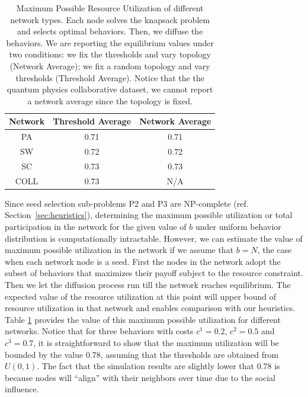 \documentclass[letterpaper]{article}
\theoremstyle{plain} 		\newtheorem{thm}{Theorem}[section]
\theoremstyle{definition} 	\newtheorem{defn}[thm]{Definition}
\theoremstyle{remark}		\newtheorem{rem}{Remark}
\begin{document}
\begin{table}[htb]\footnotesize
\centering
    \caption{Maximum Possible Resource Utilization of different network types. Each node solves the knapsack problem and selects optimal behaviors. Then, we diffuse the behaviors. We are reporting the equilibrium values under two conditions: we fix the thresholds and vary topology (Network Average); we fix a random topology and vary thresholds (Threshold Average). Notice that the the quantum physics collaborative dataset, we cannot report a network average since the topology is fixed. }\label{tab:max-util}
    \begin{tabular}{ccc} \toprule
        Network & Threshold Average & Network Average \\ \midrule
        PA & 0.71 & 0.71		\\
        SW & 0.72 & 0.72 	\\
        SC & 0.73 & 0.73		\\
        COLL & 0.73 & N/A 	\\ \bottomrule
    \end{tabular}

\end{table}
Since seed selection sub-problems P2 and P3 are NP-complete (ref. Section~\ref{sec:heuristics}), determining the maximum possible utilization or total participation in the network for the given value of $b$ under uniform behavior distribution is computationally intractable. However, we can estimate the value of maximum possible utilization in the network if we assume that $b=N$, the case when each network node is a seed. First the nodes in the network adopt the subset of behaviors that maximizes their payoff subject to the resource constraint.  Then we let the diffusion process run till the network reaches equilibrium. The expected value of the resource utilization at this point will upper bound of resource utilization in that network and enables comparison with our heuristics. Table \ref{tab:max-util} provides the value of this maximum possible utilization for different networks. Notice that for three behaviors with costs $c^1=0.2$, $c^2=0.5$ and $c^3=0.7$, it is straightforward to show that the maximum utilization will be bounded by the value 0.78, assuming that the thresholds are obtained from $U(0,1)$. The fact that the simulation results are slightly lower that 0.78 is because nodes will ``align'' with their neighbors over time due to the social influence.
\end{document}
